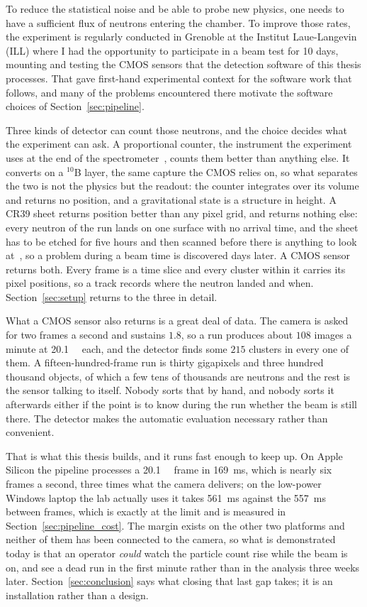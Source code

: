 \documentclass[a4paper,headsepline,oneside,11pt]{scrartcl}
\begin{document}
To reduce the statistical noise and be able to probe new physics, one needs to have a sufficient flux of neutrons entering the chamber.
To improve those rates, the experiment is regularly conducted in Grenoble at the Institut Laue-Langevin (ILL) where I had the opportunity to participate in a beam test for 10 days, mounting and testing the CMOS sensors that the detection software of this thesis processes. That gave first-hand experimental context for the software work that follows, and many of the problems encountered there motivate the software choices of Section~\ref{sec:pipeline}.

Three kinds of detector can count those neutrons, and the choice decides what
the experiment can ask. A proportional counter, the instrument the experiment
uses at the end of the spectrometer~\cite{Jenke2013detectors}, counts them
better than anything else. It converts on a $^{10}$B layer, the same capture the
CMOS relies on, so what separates the two is not the physics but the readout: the counter
integrates over its volume and returns no position, and a gravitational state is
a structure in height. A CR39 sheet returns position better than any pixel grid, and returns
nothing else: every neutron of the run lands on one surface with no arrival
time, and the sheet has to be etched for five hours and then scanned before
there is anything to look at~\cite{Filter2018}, so a problem during a beam time
is discovered days later. A CMOS sensor
returns both. Every frame is a time slice and every cluster within it carries
its pixel positions, so a track records where the neutron landed and when.
Section~\ref{sec:setup} returns to the three in detail.

What a CMOS sensor also returns is a great deal of data. The camera is asked for
two frames a second and sustains $1.8$, so a run produces about $108$ images a
minute at \SI{20.1}{\mega\pixel} each, and the detector finds some $215$ clusters in every
one of them. A fifteen-hundred-frame run is thirty gigapixels and three hundred
thousand objects, of which a few tens of thousands are neutrons and the rest is
the sensor talking to itself. Nobody sorts that by hand, and nobody sorts it
afterwards either if the point is to know during the run whether the beam is
still there. The detector makes the automatic evaluation necessary rather than
convenient.

That is what this thesis builds, and it runs fast enough to keep up. On Apple
Silicon the pipeline processes a \SI{20.1}{\mega\pixel} frame in \SI{169}{\milli\second}, which is nearly
six frames a second, three times what the camera delivers; on the low-power
Windows laptop the lab actually uses it takes \SI{561}{\milli\second} against the \SI{557}{\milli\second}
between frames, which is exactly at the limit and is measured in
Section~\ref{sec:pipeline_cost}. The margin exists on the other two platforms
and neither of them has been connected to the camera, so what is demonstrated
today is that an operator \emph{could} watch the particle count rise while the
beam is on, and see a dead run in the first minute rather than in the analysis
three weeks later. Section~\ref{sec:conclusion} says what closing that last gap
takes; it is an installation rather than a design.
\end{document}
